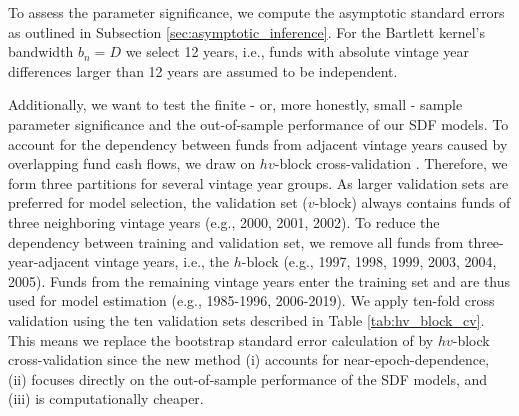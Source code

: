 \documentclass[12pt]{article}
\begin{document}
To assess the parameter significance, we compute the asymptotic standard errors as outlined in Subsection \ref{sec:asymptotic_inference}.
For the Bartlett kernel's bandwidth $b_n=D$ we select 12 years, i.e., funds with absolute vintage year differences larger than 12 years are assumed to be independent.

Additionally, we want to test the finite - or, more honestly, small - sample parameter significance and the out-of-sample performance of our SDF models.
To account for the dependency between funds from adjacent vintage years caused by overlapping fund cash flows, we draw on $hv$-block cross-validation \citep{R00}.
Therefore, we form three partitions for several vintage year groups.
As larger validation sets are preferred for model selection, the validation set ($v$-block) always contains funds of three neighboring vintage years (e.g., 2000, 2001, 2002).
To reduce the dependency between training and validation set, we remove all funds from three-year-adjacent vintage years, i.e., the $h$-block (e.g., 1997, 1998, 1999, 2003, 2004, 2005).
Funds from the remaining vintage years enter the training set and are thus used for model estimation (e.g., 1985-1996, 2006-2019).
We apply ten-fold cross validation using the ten validation sets described in Table \ref{tab:hv_block_cv}.
This means we replace the bootstrap standard error calculation of \cite{DLP12} by $hv$-block cross-validation since the new method (i) accounts for near-epoch-dependence, (ii) focuses directly on the out-of-sample performance of the SDF models, and (iii) is computationally cheaper.
\end{document}
